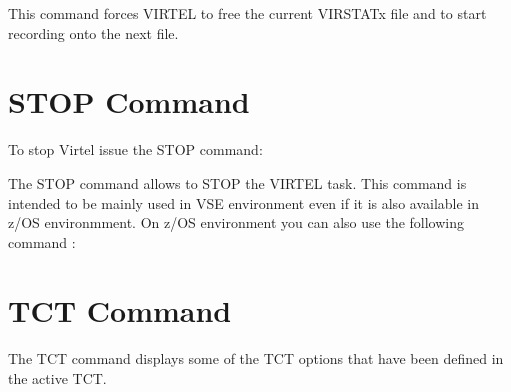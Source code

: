 \documentclass[letterpaper,10pt,english]{sphinxmanual}
\begin{document}
\begin{sphinxVerbatim}[commandchars=\\\{\}]
\end{sphinxVerbatim}

This command forces VIRTEL to free the current VIRSTATx file and to start recording onto the next file.

\ignorespaces 

\section{STOP Command}
\label{\detokenize{audit_operations_ and_performance:stop-command}}\label{\detokenize{audit_operations_ and_performance:index-23}}
To stop Virtel issue the STOP command:

\begin{sphinxVerbatim}[commandchars=\\\{\}]
\end{sphinxVerbatim}

The STOP command allows to STOP the VIRTEL task. This command is intended to be mainly used in VSE environment even if it is also available in z/OS environmment. On z/OS environment you can also use the following command :

\begin{sphinxVerbatim}[commandchars=\\\{\}]
 
\end{sphinxVerbatim}

\ignorespaces 

\section{TCT Command}
\label{\detokenize{audit_operations_ and_performance:tct-command}}\label{\detokenize{audit_operations_ and_performance:index-24}}
The TCT command displays some of the TCT options that have been defined in the active TCT.
\end{document}
